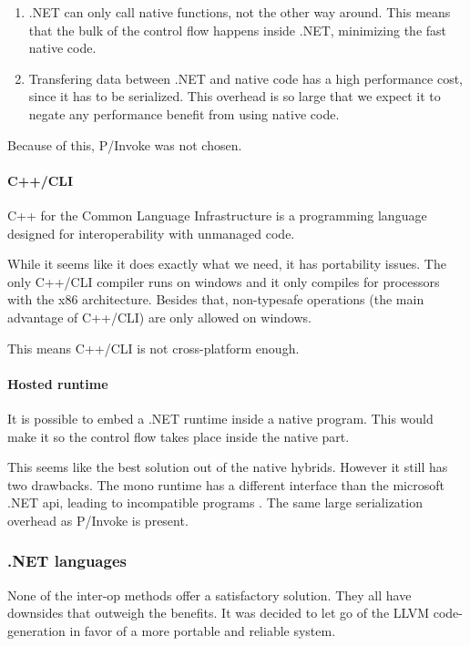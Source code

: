 \begin{enumerate}
    \item .NET can only call native functions, not the other way around.
        This means that the bulk of the control flow happens inside .NET, minimizing the fast native code.
    \item Transfering data between .NET and native code has a high performance cost\cite{msdn_interop_performance}, since it has to be serialized.
        This overhead is so large that we expect it to negate any performance benefit from using native code.
\end{enumerate}

Because of this, P/Invoke was not chosen.

\paragraph{C++/CLI}
C++ for the Common Language Infrastructure is a programming language designed for interoperability with unmanaged code.\cite{msdn_c++cli}

While it seems like it does exactly what we need, it has portability issues.
The only C++/CLI compiler runs on windows and it only compiles for processors with the x86 architecture\cite{mono_c++cli}.
Besides that, non-typesafe operations (the main advantage of C++/CLI) are only allowed on windows.\cite{mono_c++cli}

This means C++/CLI is not cross-platform enough.

\paragraph{Hosted runtime}
It is possible to embed a .NET runtime inside a native program.
This would make it so the control flow takes place inside the native part.

This seems like the best solution out of the native hybrids.
However it still has two drawbacks.
The mono runtime has a different interface than the microsoft .NET api, leading to incompatible programs \cite{mono_embedding}.
The same large serialization overhead as P/Invoke is present\cite{msdn_hosted}.

\subsubsection{.NET languages}
None of the inter-op methods offer a satisfactory solution.
They all have downsides that outweigh the benefits.
It was decided to let go of the LLVM code-generation in favor of a more portable and reliable system.


